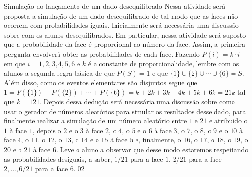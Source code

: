 \begin{sugestions}{Simulação do lançamento de um dado desequilibrado}
{
Nessa atividade será proposta a simulação de um dado desequilibrado de tal modo que as faces não ocorrem com probabilidades iguais. Inicialmente será necessária uma discussão sobre com os alunos desequilibrados. Em particular, nessa atividade será suposto que a probabilidade da face é proporcional ao número da face. Assim, a primeira pergunta envolverá obter as probabilidades de cada face. Fazendo $P({i})=k\cdot i$ em que $i=1,2,3,4,5,6$ e $k$ é a constante de proporcionalidade, lembre com os alunos a segunda regra básica de que $P(S)=1$ e que $\{1\}\cup\{2\}\cup\cdots\cup\{6\}=S$. Além disso, como os eventos elementares são disjuntos segue que $1=P(\{1\})+P(\{2\})+\cdots+P(\{6\})=k+2k+3k+4k+5k+6k=21k$ tal que $k=121$. Depois dessa dedução será necessária uma discussão sobre como usar o gerador de números aleatórios para simular os resultados desse dado, para finalmente realizar a simulação de um número aleatório entre $1$ e $21$ e atribuido o $1$ à face $1$, depois o $2$ e o $3$ à face $2$, o $4$, o $5$ e o $6$ à face $3$, o $7$, o $8$, o $9$ e o $10$ à face $4$, o $11$, o $12$, o $13$, o $14$ e o $15$ à face $5$ e, finalmente, o $16$, o $17$, o $18$, o $19$, o $20$ e o $21$ à face $6$. Leve o aluno a observar que desse modo estaremos respeitando as probabilidades desiguais, a saber, $1/21$ para a face $1$, $2/21$ para a face $2,..., 6/21$ para a face $6$.
}{0}{2}
\end{sugestions}
